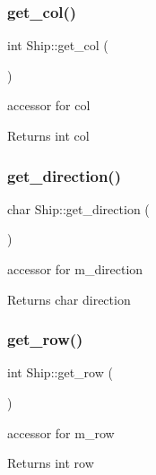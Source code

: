 \subsubsection{\texorpdfstring{get\_col()}{get\_col()}}
{\footnotesize\ttfamily int Ship\+::get\+\_\+col (\begin{DoxyParamCaption}{ }\end{DoxyParamCaption})}



accessor for col 

\begin{DoxyReturn}{Returns}
int col 
\end{DoxyReturn}
\mbox{\label{classShip_af065dcecca900497523b90776d0b0a0b}} 
\subsubsection{\texorpdfstring{get\_direction()}{get\_direction()}}
{\footnotesize\ttfamily char Ship\+::get\+\_\+direction (\begin{DoxyParamCaption}{ }\end{DoxyParamCaption})}



accessor for m\+\_\+direction 

\begin{DoxyReturn}{Returns}
char direction 
\end{DoxyReturn}
\mbox{\label{classShip_a36013095f752db7f97c0ab56ae2d036f}} 
\subsubsection{\texorpdfstring{get\_row()}{get\_row()}}
{\footnotesize\ttfamily int Ship\+::get\+\_\+row (\begin{DoxyParamCaption}{ }\end{DoxyParamCaption})}



accessor for m\+\_\+row 

\begin{DoxyReturn}{Returns}
int row 
\end{DoxyReturn}
\mbox{\label{classShip_afe7fd5445de926a8dc0c2915422fc7ae}} 
